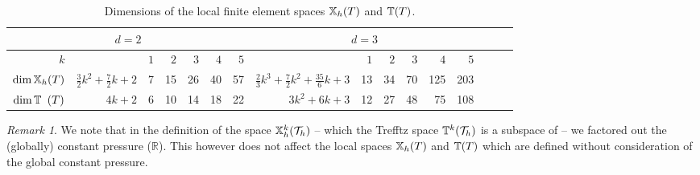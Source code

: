 \documentclass[pdflatex,sn-mathphys,Numbered]{sn-jnl}%
\theoremstyle{remark}%
\newtheorem{remark}{Remark}%
\theoremstyle{definition}%
\begin{document}
\begin{table}[!ht]
  \small
      \begin{tabular}{@{}r@{~}|@{~}r@{~}|@{~~}r@{~~}r@{~~}r@{~~}r@{~~}r@{~~}@{}|@{~}r@{~}|@{~~}r@{~~}r@{~~}r@{~~}r@{~~}r@{~~}r@{~~}r@{~~}r@{}}
      \toprule
        \multicolumn{7}{c}{$d=2$} & \multicolumn{6}{c}{$d=3$} \\
      \midrule
$k $   && $1$
    & $2$
    & $3$
    & $4$
    & $5$ &
    & $1$
    & $2$
    & $3$
    & $4$
    & $5$ \\
    $\dim \mathbb{X}_h(T)$ & $\frac32 k^2\!+\!\frac72 k\!+\!2$ & 7 & 15 & 26 & 40 & 57 %
    & $\frac23 k^3\!+\!\frac72 k^2\!+\!\frac{35}{6} k\!+\!3$ & 13 & 34 & 70 & 125 & 203 \\%
      $\dim \mathbb{T}_{\hphantom{h}}(T)$ & $4 k \!+\! 2$& 6 & 10 & 14 & 18 & 22 %
    & $3 k^2 + 6 k + 3 $&  12 & 27 & 48 & 75 & 108 \\%
    \bottomrule
  \end{tabular}
  \caption{Dimensions of the local finite element spaces $\mathbb{X}_h(T)$ and $\mathbb{T}(T)$.}\label{tab:localdims}
\end{table}

\begin{remark}
  We note that in the definition of the space $\mathbb{X}_h^k({\mathcal{T}_h})$ -- which the Trefftz space $\mathbb{T}^k({\mathcal{T}_h})$ is a subspace of -- we factored out the (globally) constant pressure ($\mathbb{R}$). This however does not affect the local spaces $\mathbb{X}_h(T)$ and $\mathbb{T}(T)$ which are defined without consideration of the global constant pressure. 
\end{remark}
\end{document}
